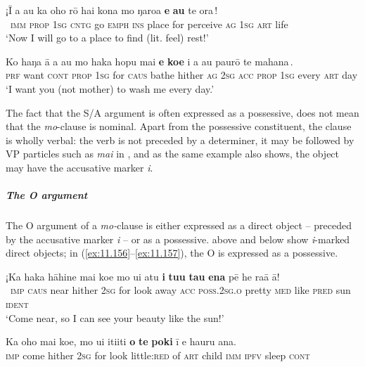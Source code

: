 \ea\label{ex:11.153}
\gll ¡{\ꞌ}Ī a au ka oho rō hai kona {\ob}mo ŋaro{\ꞌ}a \textbf{e} \textbf{au} te ora\,{\cb}! \\
~\textsc{imm} \textsc{prop} \textsc{1sg} \textsc{cntg} go \textsc{emph} \textsc{ins} place {\db}for perceive \textsc{ag} \textsc{1sg} \textsc{art} life \\

\glt 
‘Now I will go to a place to find (lit. feel) rest!’ \textstyleExampleref{[R214.042]} 
\z

\ea\label{ex:11.154}
\gll Ko haŋa {\ꞌ}ā a au {\ob}mo haka hopu mai \textbf{e} \textbf{koe} i a au  paurō te mahana\,{\cb}.\\
\textsc{prf} want \textsc{cont} \textsc{prop} \textsc{1sg} {\db}for \textsc{caus} bathe hither \textsc{ag} \textsc{2sg} \textsc{acc} \textsc{prop} \textsc{1sg}  every \textsc{art} day\\

\glt
‘I want you (not mother) to wash me every day.’ \textstyleExampleref{[R313.178]} 
\z

The fact that the S/A argument is often expressed as a possessive, does not mean that the \textit{mo}{}-clause is nominal. Apart from the possessive constituent, the clause is wholly verbal: the verb is not preceded by a determiner, it may be followed by VP particles such as \textit{mai} in , and as the same example also shows, the object may have the accusative marker \textit{i}.

\subparagraph{The O argument} The O argument of a \textit{mo-}clause is either expressed as a direct object – preceded by the accusative marker \textit{i} – or as a possessive.  above and  below show \textit{i}{}-marked direct objects; in (\ref{ex:11.156}–\ref{ex:11.157}), the O is expressed as a possessive.

\ea\label{ex:11.155}
\gll ¡Ka haka hāhine mai koe mo u{\ꞌ}i atu \textbf{i} \textbf{tu{\ꞌ}u} \textbf{tau} \textbf{ena}  pē he ra{\ꞌ}ā {\ꞌ}ā!\\
~\textsc{imp} \textsc{caus} near hither \textsc{2sg} for look away \textsc{acc} \textsc{poss.2sg.o} pretty \textsc{med}  like \textsc{pred} sun \textsc{ident}\\

\glt 
‘Come near, so I can see your beauty like the sun!’ \textstyleExampleref{[R301.212]} 
\z

\ea\label{ex:11.156}
\gll Ka oho mai koe, mo u{\ꞌ}i {\ꞌ}iti{\ꞌ}iti \textbf{o} \textbf{te} \textbf{poki} {\ꞌ}ī e ha{\ꞌ}uru {\ꞌ}ana. \\
\textsc{imp} come hither \textsc{2sg} for look little:\textsc{red} of \textsc{art} child \textsc{imm} \textsc{ipfv} sleep \textsc{cont} \\

